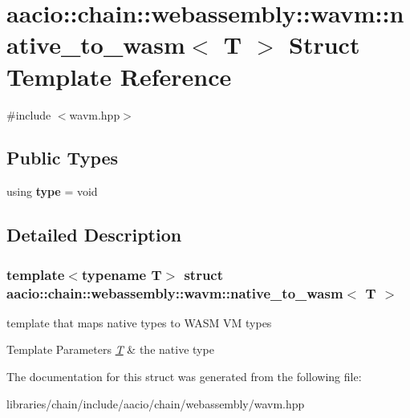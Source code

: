 \hypertarget{structaacio_1_1chain_1_1webassembly_1_1wavm_1_1native__to__wasm}{}\section{aacio\+:\+:chain\+:\+:webassembly\+:\+:wavm\+:\+:native\+\_\+to\+\_\+wasm$<$ T $>$ Struct Template Reference}
\label{structaacio_1_1chain_1_1webassembly_1_1wavm_1_1native__to__wasm}


{\ttfamily \#include $<$wavm.\+hpp$>$}

\subsection*{Public Types}
\begin{DoxyCompactItemize}
\item 
\mbox{\label{structaacio_1_1chain_1_1webassembly_1_1wavm_1_1native__to__wasm_a216e989b4716cbb46ead9a5ed0563098}} 
using {\bfseries type} = void
\end{DoxyCompactItemize}


\subsection{Detailed Description}
\subsubsection*{template$<$typename T$>$\newline
struct aacio\+::chain\+::webassembly\+::wavm\+::native\+\_\+to\+\_\+wasm$<$ T $>$}

template that maps native types to W\+A\+SM VM types 
\begin{DoxyTemplParams}{Template Parameters}
{\em \mbox{\hyperlink{struct_t}{T}}} & the native type \\
\hline
\end{DoxyTemplParams}


The documentation for this struct was generated from the following file\+:\begin{DoxyCompactItemize}
\item 
libraries/chain/include/aacio/chain/webassembly/wavm.\+hpp\end{DoxyCompactItemize}
